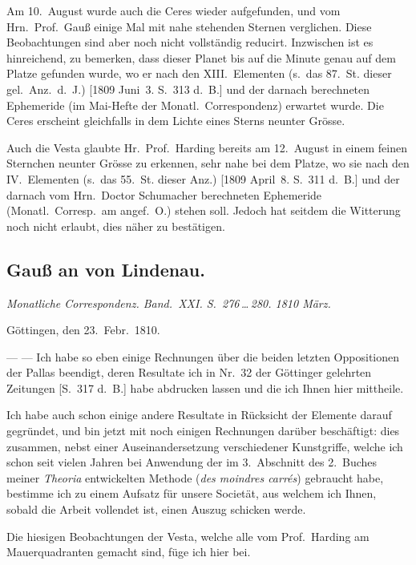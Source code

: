 \documentclass[12pt,a4paper]{book}
\begin{document}
Am 10.~August wurde auch die Ceres wieder aufgefunden, und vom Hrn.~Prof.~Gau{\ss} einige Mal mit nahe stehenden Sternen verglichen. Diese Beobachtungen sind aber noch nicht vollst\"andig reducirt. Inzwischen ist es hinreichend, zu bemerken, dass dieser Planet bis auf die Minute genau auf dem Platze gefunden wurde, wo er nach den XIII.~Elementen (s.~das 87.~St. dieser gel.~Anz.~d.~J.) [1809 Juni~3. S.~313 d.~B.] und der darnach berechneten Ephemeride (im Mai-Hefte der Monatl.~Correspondenz) erwartet wurde. Die Ceres erscheint gleichfalls in dem Lichte eines Sterns neunter Gr\"osse.

Auch die Vesta glaubte Hr.~Prof.~Harding bereits am 12.~August in einem feinen Sternchen neunter Gr\"osse zu erkennen, sehr nahe bei dem Platze, wo sie nach den IV.~Elementen (s.~das 55.~St. dieser Anz.) [1809 April~8. S.~311 d.~B.] und der darnach vom Hrn.~Doctor Schumacher berechneten Ephemeride (Monatl.~Corresp.~am angef.~O.) stehen soll. Jedoch hat seitdem die Witterung noch nicht erlaubt, dies n\"aher zu best\"atigen.


\newpage
\subsection*{Gau{\ss} an von Lindenau.}

\textit{Monatliche Correspondenz. Band.~XXI. S.~276\,\ldots\,280. 1810 M\"arz.}

G\"ottingen, den 23.~Febr.~1810.

---\,\,--- Ich habe so eben einige Rechnungen \"uber die beiden letzten Oppositionen der Pallas beendigt, deren Resultate ich in Nr.~32 der G\"ottinger gelehrten Zeitungen [S.~317 d.~B.] habe abdrucken lassen und die ich Ihnen hier mittheile.

Ich habe auch schon einige andere Resultate in R\"ucksicht der Elemente darauf gegr\"undet, und bin jetzt mit noch einigen Rechnungen dar\"uber besch\"aftigt: dies zusammen, nebst einer Auseinandersetzung verschiedener Kunstgriffe, welche ich schon seit vielen Jahren bei Anwendung der im 3.~Abschnitt des 2.~Buches meiner \textit{Theoria} entwickelten Methode (\textit{des moindres carr\'{e}s}) gebraucht habe, bestimme ich zu einem Aufsatz f\"ur unsere Societ\"at, aus welchem ich Ihnen, sobald die Arbeit vollendet ist, einen Auszug schicken werde.

Die hiesigen Beobachtungen der Vesta, welche alle vom Prof.~Harding am Mauerquadranten gemacht sind, f\"uge ich hier bei.
\end{document}
